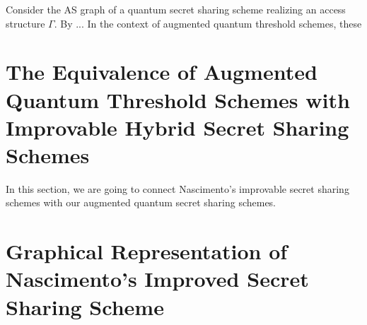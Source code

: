 Consider the AS graph of a quantum secret sharing scheme realizing an access structure $\Gamma$. By ... In the context of augmented quantum threshold schemes, these 


\section{The Equivalence of Augmented Quantum Threshold Schemes with Improvable Hybrid Secret Sharing Schemes}

In this section, we are going to connect Nascimento's improvable secret sharing schemes with our augmented quantum secret sharing schemes. 

\section{Graphical Representation of Nascimento's Improved Secret Sharing Scheme}